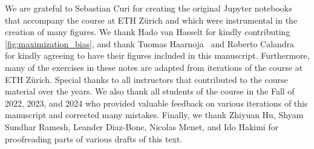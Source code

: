 We are grateful to Sebastian Curi for creating the original Jupyter notebooks that accompany the course at ETH Zürich and which were instrumental in the creation of many figures.
We thank Hado van Hasselt for kindly contributing \cref{fig:maximization_bias}, and thank Tuomas Haarnoja~\citep{haarnoja2018soft} and Roberto Calandra~\citep{chua2018deep} for kindly agreeing to have their figures included in this manuscript.
Furthermore, many of the exercises in these notes are adapted from iterations of the course at ETH Zürich.
Special thanks to all instructors that contributed to the course material over the years.
We also thank all students of the course in the Fall of 2022, 2023, and 2024 who provided valuable feedback on various iterations of this manuscript and corrected many mistakes.
Finally, we thank Zhiyuan Hu, Shyam Sundhar Ramesh, Leander Diaz-Bone, Nicolas Menet, and Ido Hakimi for proofreading parts of various drafts of this text.
